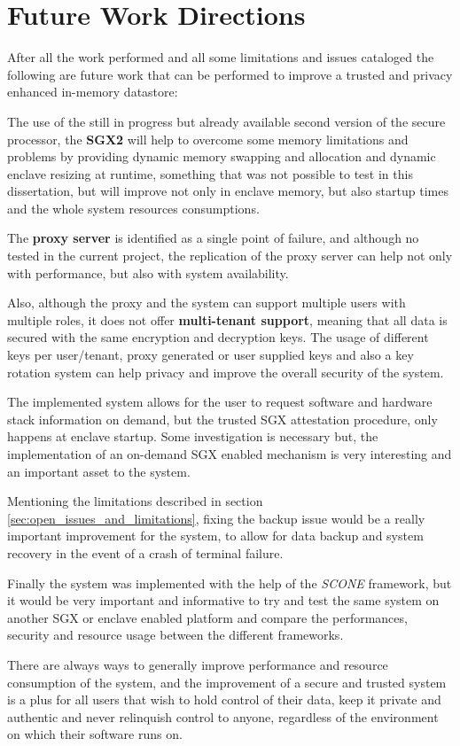 \section{Future Work Directions}
\label{sec:future_work_directions}

After all the work performed and all some limitations and issues cataloged the following are future work that can be performed to improve a trusted and privacy enhanced in-memory datastore:

The use of the still in progress but already available second version of the secure processor, the \textbf{\gls{SGX}2} will help to overcome some memory limitations and problems by providing dynamic memory swapping and allocation and dynamic enclave resizing at runtime, something that was not possible to test in this dissertation, but will improve not only in enclave memory, but also startup times and the whole system resources consumptions.

The \textbf{proxy server} is identified as a single point of failure, and although no tested in the current project, the replication of the proxy server can help not only with performance, but also with system availability.

Also, although the proxy and the system can support multiple users with multiple roles, it does not offer \textbf{multi-tenant support}, meaning that all data is secured with the same encryption and decryption keys. The usage of different keys per user/tenant, proxy generated or user supplied keys and also a key rotation system can help privacy and improve the overall security of the system.

The implemented system allows for the user to request software and hardware stack information on demand, but the trusted \gls{SGX} attestation procedure, only happens at enclave startup. Some investigation is necessary but, the implementation of an on-demand \gls{SGX} enabled mechanism is very interesting and an important asset to the system.

Mentioning the limitations described in section \ref{sec:open_issues_and_limitations}, fixing the backup issue would be a really important improvement for the system, to allow for data backup and system recovery in the event of a crash of terminal failure.

Finally the system was implemented with the help of the \textit{SCONE} framework, but it would be very important and informative to try and test the same system on another \gls{SGX} or enclave enabled platform and compare the performances, security and resource usage between the different frameworks.

There are always ways to generally improve performance and resource consumption of the system, and the improvement of a secure and trusted system is a plus for all users that wish to hold control of their data, keep it private and authentic and never relinquish control to anyone, regardless of the environment on which their software runs on.